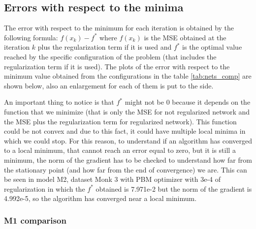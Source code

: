 \subsection{Errors with respect to the minima}
\label{sec:minimum_error}
The error with respect to the minimum for each iteration is obtained by the following formula: $ f(x_k) - f^*$ where  $f(x_{k})$ is the MSE obtained at the iteration $k$ plus the  regularization term if it is used and $f^*$ is the optimal value reached by the specific configuration of the problem (that includes the regularization term if it is used). The plots of the error with respect to the minimum value obtained from the configurations in the table \ref{tab:nets_comp} are shown below, also an enlargement for each of them is put to the side.

An important thing to notice is that $f^*$ might not be 0 because it depends on the function that we minimize (that is only the MSE for not regularized network and the MSE plus the regularization term for regularized network). This function could be not convex and due to this fact, it could have multiple local minima in which we could stop. For this reason, to understand if an algorithm has converged to a local minimum, that cannot reach an error equal to zero, but it is still a minimum, the norm of the gradient has to be checked to understand how far from the stationary point (and how far from the end of convergence) we are. This can be seen in model M2, dataset Monk 3 with PBM optimizer with 3e-4 of regularization in which the $f^*$ obtained is 7.971e-2 but the norm of the gradient is 4.992e-5, so the algorithm has converged near a local minimum.

\subsubsection{M1 comparison}

